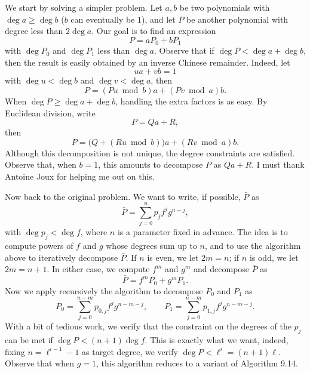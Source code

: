 \documentclass[11pt]{article}
\begin{document}
We start by solving a simpler problem. Let $a,b$ be two polynomials
with $\deg a\ge \deg b$ ($b$ can eventually be $1$), and let $P$ be
another polynomial with degree less than $2\deg a$. Our goal is to
find an expression
\begin{equation}
  P = aP_0 + bP_1  
\end{equation}
with $\deg P_0$ and $\deg P_1$ less than $\deg a$. Observe that if
$\deg P<\deg a+\deg b$, then the result is easily obtained by an
inverse Chinese remainder. Indeed, let
\begin{equation}
  ua + vb = 1
\end{equation}
with $\deg u<\deg b$ and $\deg v<\deg a$, then
\begin{equation}
  P = (Pu\bmod b)a + (Pv\bmod a)b.
\end{equation}
When $\deg P \ge \deg a+\deg b$, handling the extra factors is as
easy. By Euclidean division, write
\begin{equation}
  P = Qa + R,
\end{equation}
then
\begin{equation}
  P = \bigl(Q + (Ru\bmod b)\bigr)a + (Rv\bmod a)b.
\end{equation}
Although this decomposition is not unique, the degree constraints are
satisfied. Observe that, when $b=1$, this amounts to decompose $P$ as
$Qa+R$. I must thank Antoine Joux for helping me out on this.

Now back to the original problem. We want to write, if possible,
$\bar{P}$ as
\begin{equation}
  \bar{P} = \sum_{j=0}^n p_jf^jg^{n-j},
\end{equation}
with $\deg p_j<\deg f$, where $n$ is a parameter fixed in advance. The
idea is to compute powers of $f$ and $g$ whose degrees sum up to $n$,
and to use the algorithm above to iteratively decompose $\bar{P}$. If
$n$ is even, we let $2m=n$; if $n$ is odd, we let $2m=n+1$. In either
case, we compute $f^m$ and $g^m$ and decompose $\bar{P}$ as
\begin{equation}
  \bar{P} = f^mP_0 + g^mP_1.
\end{equation}
Now we apply recursively the algorithm to decompose $P_0$ and $P_1$
as
\begin{equation}
  P_0 = \sum_{j=0}^{n-m} p_{0,j}f^jg^{n-m-j},\qquad
  P_1 = \sum_{j=0}^{n-m} p_{1,j}f^jg^{n-m-j}.
\end{equation}
With a bit of tedious work, we verify that the constraint on the
degrees of the $p_j$ can be met if $\deg P<(n+1)\deg f$. This is
exactly what we want, indeed, fixing $n=\ell^{i-1}-1$ as target
degree, we verify $\deg P < \ell^i = (n+1)\ell$. Observe that when
$g=1$, this algorithm reduces to a variant of Algorithm 9.14.
\end{document}
